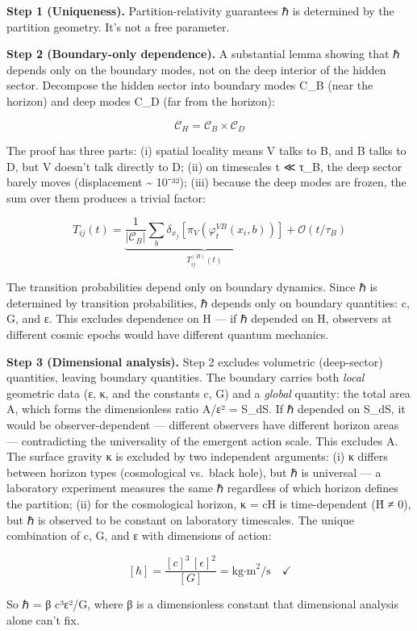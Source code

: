 \documentclass[
]{article}
\begin{document}
\textbf{Step 1 (Uniqueness).} Partition-relativity guarantees ℏ is
determined by the partition geometry. It's not a free parameter.

\textbf{Step 2 (Boundary-only dependence).} A substantial lemma showing
that ℏ depends only on the boundary modes, not on the deep interior of
the hidden sector. Decompose the hidden sector into boundary modes C\_B
(near the horizon) and deep modes C\_D (far from the horizon):

\[\mathcal{C}_H = \mathcal{C}_B \times \mathcal{C}_D\]

The proof has three parts: (i) spatial locality means V talks to B, and
B talks to D, but V doesn't talk directly to D; (ii) on timescales t ≪
τ\_B, the deep sector barely moves (displacement \textasciitilde{}
10⁻³²); (iii) because the deep modes are frozen, the sum over them
produces a trivial factor:

\[T_{ij}(t) = \underbrace{\frac{1}{|\mathcal{C}_B|} \sum_{b} \delta_{x_j}[\pi_V(\varphi_t^{VB}(x_i, b))]}_{T^{(B)}_{ij}(t)} + \mathcal{O}(t/\tau_B)\]

The transition probabilities depend only on boundary dynamics. Since ℏ
is determined by transition probabilities, ℏ depends only on boundary
quantities: c, G, and ε. This excludes dependence on H --- if ℏ depended
on H, observers at different cosmic epochs would have different quantum
mechanics.

\textbf{Step 3 (Dimensional analysis).} Step 2 excludes volumetric
(deep-sector) quantities, leaving boundary quantities. The boundary
carries both \emph{local} geometric data (ε, κ, and the constants c, G)
and a \emph{global} quantity: the total area A, which forms the
dimensionless ratio A/ε² = S\_dS. If ℏ depended on S\_dS, it would be
observer-dependent --- different observers have different horizon areas
--- contradicting the universality of the emergent action scale. This
excludes A. The surface gravity κ is excluded by two independent
arguments: (i) κ differs between horizon types (cosmological vs.~black
hole), but ℏ is universal --- a laboratory experiment measures the same
ℏ regardless of which horizon defines the partition; (ii) for the
cosmological horizon, κ = cH is time-dependent (Ḣ ≠ 0), but ℏ is
observed to be constant on laboratory timescales. The unique combination
of c, G, and ε with dimensions of action:

\[[\hbar] = \frac{[c]^3 \, [\epsilon]^2}{[G]} = \text{kg·m}^2/\text{s} \quad \checkmark\]

So ℏ = β c³ε²/G, where β is a dimensionless constant that dimensional
analysis alone can't fix.
\end{document}
